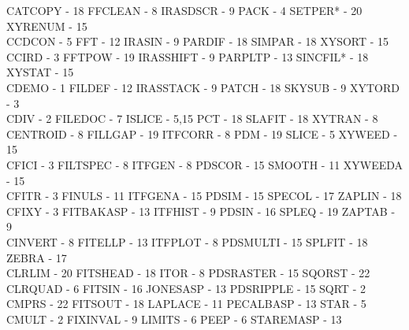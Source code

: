 {\begin{tabbing}
 CATCOPY - 18                            \>FFCLEAN - 8
   \>IRASDSCR - 9                            \>
 PACK - 4                                \>SETPER* - 20
   \>XYRENUM - 15                            \\
 CCDCON - 5                              \>FFT - 12
   \>IRASIN - 9                              \>
 PARDIF - 18                             \>SIMPAR - 18
   \>XYSORT - 15                             \\
 CCIRD - 3                               \>FFTPOW - 19
   \>IRASSHIFT - 9                           \>
 PARPLTP - 13                            \>SINCFIL* - 18
   \>XYSTAT - 15                             \\
 CDEMO - 1                               \>FILDEF - 12
   \>IRASSTACK - 9                           \>
 PATCH - 18                              \>SKYSUB - 9
   \>XYTORD - 3                              \\
 CDIV - 2                                \>FILEDOC - 7
   \>ISLICE - 5,15                           \>
 PCT - 18                                \>SLAFIT - 18
   \>XYTRAN - 8                              \\
 CENTROID - 8                            \>FILLGAP - 19
   \>ITFCORR - 8                             \>
 PDM - 19                                \>SLICE - 5
   \>XYWEED - 15                             \\
 CFICI - 3                               \>FILTSPEC - 8
   \>ITFGEN - 8                              \>
 PDSCOR - 15                             \>SMOOTH - 11
   \>XYWEEDA - 15                            \\
 CFITR - 3                               \>FINULS - 11
   \>ITFGENA - 15                            \>
 PDSIM - 15                              \>SPECOL - 17
   \>ZAPLIN - 18                             \\
 CFIXY - 3                               \>FITBAKASP - 13
   \>ITFHIST - 9                             \>
 PDSIN - 16                              \>SPLEQ - 19
   \>ZAPTAB - 9                              \\
 CINVERT - 8                             \>FITELLP - 13
   \>ITFPLOT - 8                             \>
 PDSMULTI - 15                           \>SPLFIT - 18
   \>ZEBRA - 17                              \\
 CLRLIM - 20                             \>FITSHEAD - 18
   \>ITOR - 8                                \>
 PDSRASTER - 15                          \>SQORST - 22
   \\
 CLRQUAD - 6                             \>FITSIN - 16
   \>JONESASP - 13                           \>
 PDSRIPPLE - 15                          \>SQRT - 2
   \\
 CMPRS - 22                              \>FITSOUT - 18
   \>LAPLACE - 11                            \>
 PECALBASP - 13                          \>STAR - 5
   \\
 CMULT - 2                               \>FIXINVAL - 9
   \>LIMITS - 6                              \>
 PEEP - 6                                \>STAREMASP - 13
   \\
\end{tabbing}}

